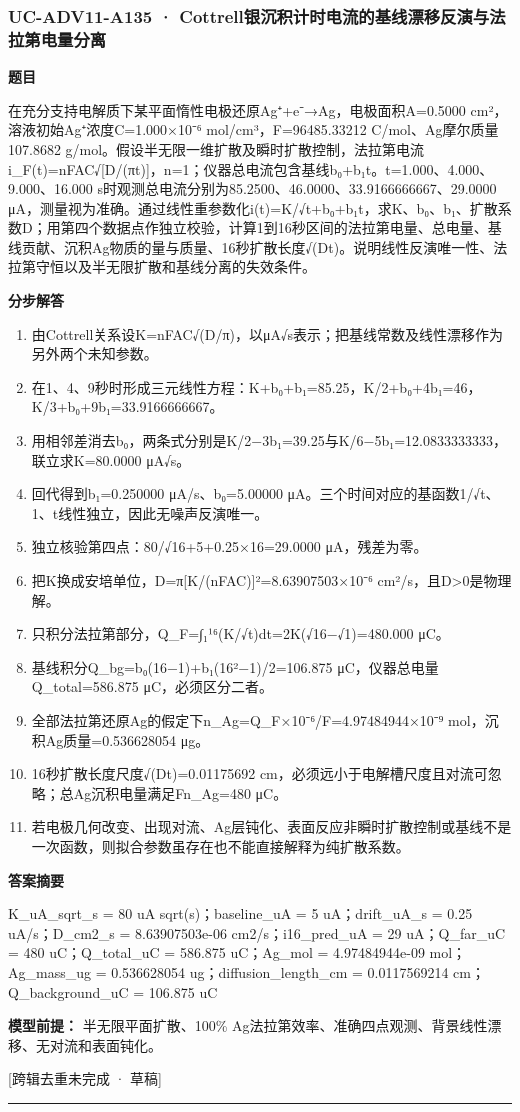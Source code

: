 \documentclass[UTF8,11pt,a4paper]{ctexart}
\begin{document}
\subsubsection*{UC-ADV11-A135 · Cottrell银沉积计时电流的基线漂移反演与法拉第电量分离}
\noindent\textbf{题目}\par
在充分支持电解质下某平面惰性电极还原Ag⁺+e⁻→Ag，电极面积A=0.5000 cm²，溶液初始Ag⁺浓度C=1.000×10⁻⁶ mol/cm³，F=96485.33212 C/mol、Ag摩尔质量107.8682 g/mol。假设半无限一维扩散及瞬时扩散控制，法拉第电流i\_F(t)=nFAC√[D/(πt)]，n=1；仪器总电流包含基线b₀+b₁t。t=1.000、4.000、9.000、16.000 s时观测总电流分别为85.2500、46.0000、33.9166666667、29.0000 μA，测量视为准确。通过线性重参数化i(t)=K/√t+b₀+b₁t，求K、b₀、b₁、扩散系数D；用第四个数据点作独立校验，计算1到16秒区间的法拉第电量、总电量、基线贡献、沉积Ag物质的量与质量、16秒扩散长度√(Dt)。说明线性反演唯一性、法拉第守恒以及半无限扩散和基线分离的失效条件。\par
\medskip\noindent\textbf{分步解答}
\begin{enumerate}
\item 由Cottrell关系设K=nFAC√(D/π)，以μA√s表示；把基线常数及线性漂移作为另外两个未知参数。
\item 在1、4、9秒时形成三元线性方程：K+b₀+b₁=85.25，K/2+b₀+4b₁=46，K/3+b₀+9b₁=33.9166666667。
\item 用相邻差消去b₀，两条式分别是K/2−3b₁=39.25与K/6−5b₁=12.0833333333，联立求K=80.0000 μA√s。
\item 回代得到b₁=0.250000 μA/s、b₀=5.00000 μA。三个时间对应的基函数1/√t、1、t线性独立，因此无噪声反演唯一。
\item 独立核验第四点：80/√16+5+0.25×16=29.0000 μA，残差为零。
\item 把K换成安培单位，D=π[K/(nFAC)]²=8.63907503×10⁻⁶ cm²/s，且D>0是物理解。
\item 只积分法拉第部分，Q\_F=∫₁¹⁶(K/√t)dt=2K(√16−√1)=480.000 μC。
\item 基线积分Q\_bg=b₀(16−1)+b₁(16²−1)/2=106.875 μC，仪器总电量Q\_total=586.875 μC，必须区分二者。
\item 全部法拉第还原Ag的假定下n\_Ag=Q\_F×10⁻⁶/F=4.97484944×10⁻⁹ mol，沉积Ag质量=0.536628054 μg。
\item 16秒扩散长度尺度√(Dt)=0.01175692 cm，必须远小于电解槽尺度且对流可忽略；总Ag沉积电量满足Fn\_Ag=480 μC。
\item 若电极几何改变、出现对流、Ag层钝化、表面反应非瞬时扩散控制或基线不是一次函数，则拟合参数虽存在也不能直接解释为纯扩散系数。
\end{enumerate}
\noindent\textbf{答案摘要}\par
K\_uA\_sqrt\_s = 80 uA sqrt(s)；baseline\_uA = 5 uA；drift\_uA\_s = 0.25 uA/s；D\_cm2\_s = 8.63907503e-06 cm2/s；i16\_pred\_uA = 29 uA；Q\_far\_uC = 480 uC；Q\_total\_uC = 586.875 uC；Ag\_mol = 4.97484944e-09 mol；Ag\_mass\_ug = 0.536628054 ug；diffusion\_length\_cm = 0.0117569214 cm；Q\_background\_uC = 106.875 uC\par
\noindent\textbf{模型前提：}
半无限平面扩散、100\% Ag法拉第效率、准确四点观测、背景线性漂移、无对流和表面钝化。\par
\noindent\textcolor{red!65!black}{[跨辑去重未完成 · 草稿]} \par
\medskip\hrule\medskip
{}
\end{document}
